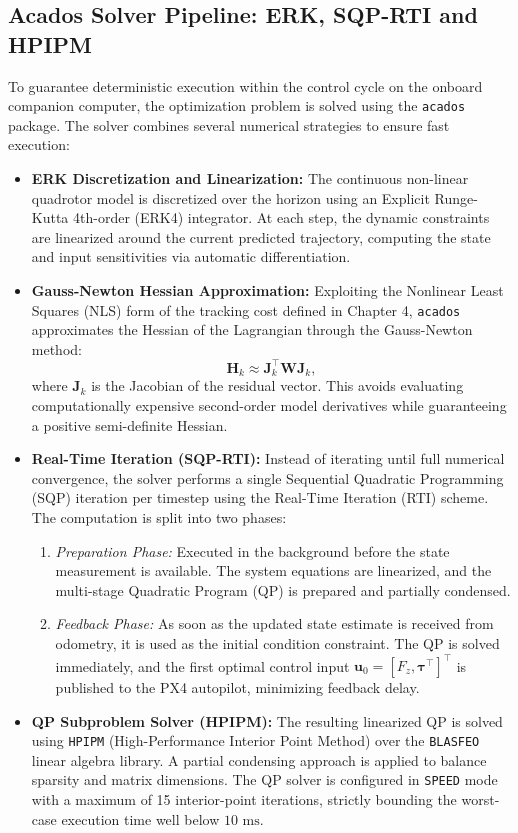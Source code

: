 \subsection{Acados Solver Pipeline: ERK, SQP-RTI and HPIPM}
To guarantee deterministic execution within the control cycle on the onboard companion computer, the optimization problem is solved using the \texttt{acados} package. The solver combines several numerical strategies to ensure fast execution:
\begin{itemize}
    \item \textbf{ERK Discretization and Linearization:} The continuous non-linear quadrotor model is discretized over the horizon using an Explicit Runge-Kutta 4th-order (ERK4) integrator. At each step, the dynamic constraints are linearized around the current predicted trajectory, computing the state and input sensitivities via automatic differentiation.
    \item \textbf{Gauss-Newton Hessian Approximation:} Exploiting the Nonlinear Least Squares (NLS) form of the tracking cost defined in Chapter 4, \texttt{acados} approximates the Hessian of the Lagrangian through the Gauss-Newton method:
    \begin{equation}
        \mathbf{H}_k \approx \mathbf{J}_k^\top \mathbf{W} \mathbf{J}_k,
    \end{equation}
    where $\mathbf{J}_k$ is the Jacobian of the residual vector. This avoids evaluating computationally expensive second-order model derivatives while guaranteeing a positive semi-definite Hessian.
    \item \textbf{Real-Time Iteration (SQP-RTI):} Instead of iterating until full numerical convergence, the solver performs a single Sequential Quadratic Programming (SQP) iteration per timestep using the Real-Time Iteration (RTI) scheme. The computation is split into two phases:
    \begin{enumerate}
        \item \textit{Preparation Phase:} Executed in the background before the state measurement is available. The system equations are linearized, and the multi-stage Quadratic Program (QP) is prepared and partially condensed.
        \item \textit{Feedback Phase:} As soon as the updated state estimate is received from odometry, it is used as the initial condition constraint. The QP is solved immediately, and the first optimal control input $\mathbf{u}_0 = [F_z, \boldsymbol{\tau}^\top]^\top$ is published to the PX4 autopilot, minimizing feedback delay.
    \end{enumerate}
    \item \textbf{QP Subproblem Solver (HPIPM):} The resulting linearized QP is solved using \texttt{HPIPM} (High-Performance Interior Point Method) over the \texttt{BLASFEO} linear algebra library. A partial condensing approach is applied to balance sparsity and matrix dimensions. The QP solver is configured in \texttt{SPEED} mode with a maximum of 15 interior-point iterations, strictly bounding the worst-case execution time well below $10\text{ ms}$.
\end{itemize}

